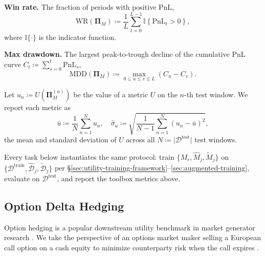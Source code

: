 \begin{enumerate}[label=\textbf{[U\arabic*]}]
        \item \textbf{Win rate.} The fraction of periods with positive
        PnL,
        \begin{equation}
          \mathrm{WR}(\mathbf{\Pi}_M) \coloneq \frac{1}{L}
          \sum_{t=0}^{L-1} \mathbb{I}\left\{\mathrm{PnL}_t >
          0\right\},
          \label{eq:utility-winrate}
        \end{equation}
        where \(\mathbb{I}\{\cdot\}\) is the indicator function.

        \item \textbf{Max drawdown.} The largest peak-to-trough decline
        of the cumulative PnL curve \(C_t \coloneq \sum_{s=0}^{t}
        \mathrm{PnL}_s\),
        \begin{equation}
          \mathrm{MDD}(\mathbf{\Pi}_M) \coloneq \max_{0 \leq u \leq v
          \leq L} \left(C_u - C_v\right).
          \label{eq:utility-mdd}
        \end{equation}
      \end{enumerate}

      Let \(u_n \coloneq U\left(\mathbf{\Pi}_M^{(n)}\right)\) be the value
      of a metric \(U\) on the \(n\)-th test window. We report each metric
      as
      \begin{equation}
          \bar{u} \coloneq \frac{1}{N}\sum_{n=1}^{N} u_n, \quad
          \hat{\sigma}_u \coloneq \sqrt{\frac{1}{N-1}
          \sum_{n=1}^{N} \left(u_n - \bar{u}\right)^2},
        \label{eq:utility-aggregation}
      \end{equation}
      the mean and standard deviation of \(U\) across all \(N \coloneq
      \vert\mathcal{D}^{\mathrm{test}}\vert\) test windows.

      Every task below instantiates the same protocol: train
      \(\{M_r, \hat{M}_j, \tilde{M}_j\}\) on
      \(\{\mathcal{D}^{\mathrm{train}}, \hat{\mathcal{D}}_j,
      \tilde{\mathcal{D}}_j\}\) per
      §\ref{sec:utility-training-framework}--\ref{sec:augmented-training},
      evaluate on \(\mathcal{D}^{\mathrm{test}}\), and report the toolbox
      metrics above.

\subsection{Option Delta Hedging}\label{sec:option-hedging}
    Option hedging is a popular downstream utility benchmark in market
    generator research \cite{Tanaka25, Boursin22}. We take the perspective
    of an options market maker selling a European call option on a cash
    equity to minimize counterparty risk when the call expires
    \cite{Fecamp20}.


